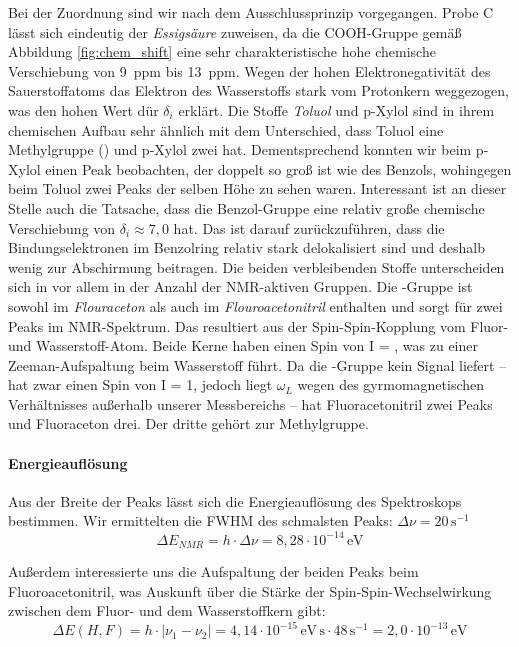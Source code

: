\documentclass[a4paper]{scrartcl} %
\begin{document}
Bei der Zuordnung sind wir nach dem Ausschlussprinzip vorgegangen. Probe C lässt sich eindeutig der \emph{Essigsäure} zuweisen, da die COOH-Gruppe gemäß Abbildung \ref{fig:chem_shift} eine sehr charakteristische hohe chemische Verschiebung von \SI{9}{ppm} bis \SI{13}{ppm}. Wegen der hohen Elektronegativität des Sauerstoffatoms das Elektron des Wasserstoffs stark vom Protonkern weggezogen, was den hohen Wert dür $\delta_i$ erklärt.
Die Stoffe \emph{Toluol} und {p-Xylol} sind in ihrem chemischen Aufbau sehr ähnlich mit dem Unterschied, dass Toluol eine Methylgruppe () und p-Xylol zwei hat. Dementsprechend konnten wir beim p-Xylol einen Peak beobachten, der doppelt so groß ist wie des Benzols, wohingegen beim Toluol zwei Peaks der selben Höhe zu sehen waren. Interessant ist an dieser Stelle auch die Tatsache, dass die Benzol-Gruppe eine relativ große chemische Verschiebung von $\delta_i \approx 7,0$ hat. Das ist darauf zurückzuführen, dass die Bindungselektronen im Benzolring relativ stark delokalisiert sind und deshalb wenig zur Abschirmung beitragen.
Die beiden verbleibenden Stoffe unterscheiden sich in vor allem in der Anzahl der NMR-aktiven Gruppen. Die -Gruppe ist sowohl im \emph{Flouraceton} als auch im \emph{Flouroacetonitril} enthalten und sorgt für zwei Peaks im NMR-Spektrum. Das resultiert aus der Spin-Spin-Kopplung vom Fluor- und Wasserstoff-Atom. Beide Kerne haben einen Spin von I = , was zu einer Zeeman-Aufspaltung beim Wasserstoff führt. Da die -Gruppe kein Signal liefert --  hat zwar einen Spin von I = 1, jedoch liegt $\omega_L$ wegen des gyrmomagnetischen Verhältnisses außerhalb unserer Messbereichs -- hat Fluoracetonitril zwei Peaks und Fluoraceton drei. Der dritte gehört zur Methylgruppe.

\paragraph{Energieauflösung}

Aus der Breite der Peaks lässt sich die Energieauflösung des Spektroskops bestimmen. Wir ermittelten die FWHM des schmalsten Peaks: $\Delta \nu = 20\, \mathrm{s^{-1}}$
\begin{equation}
	\Delta E_{NMR} = h \cdot \Delta \nu = 8,28 \cdot 10^{-14} \, \mathrm{eV}
\end{equation}

Außerdem interessierte uns die Aufspaltung der beiden Peaks beim Fluoroacetonitril, was Auskunft über die Stärke der Spin-Spin-Wechselwirkung zwischen dem Fluor- und dem Wasserstoffkern gibt:
\begin{equation}
	\Delta E(H, F) = h \cdot | \nu_1 - \nu_2 | = 4,14 \cdot 10^{-15} \, \mathrm{eV\,s} \cdot 48 \, \mathrm{s^{-1}} = 2,0 \cdot 10^{-13} \, \mathrm{eV}
\end{equation}
\end{document}
